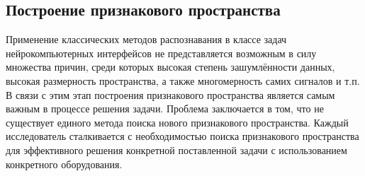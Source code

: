 \documentclass[12pt,fleqn]{article}
\begin{document}
	\subsection{Построение признакового пространства}
	\par Применение классических методов распознавания в классе задач нейрокомпьютерных интерфейсов не представляется возможным в силу множества причин, среди которых высокая степень зашумлённости данных, высокая размерность пространства, а также многомерность самих сигналов и т.п. В связи с этим этап построения признакового пространства является самым важным в процессе решения задачи. Проблема заключается в том, что не существует единого метода поиска нового признакового пространства. Каждый исследователь сталкивается с необходимостью поиска признакового пространства для эффективного решения конкретной поставленной задачи с использованием конкретного оборудования. 
\end{document}
